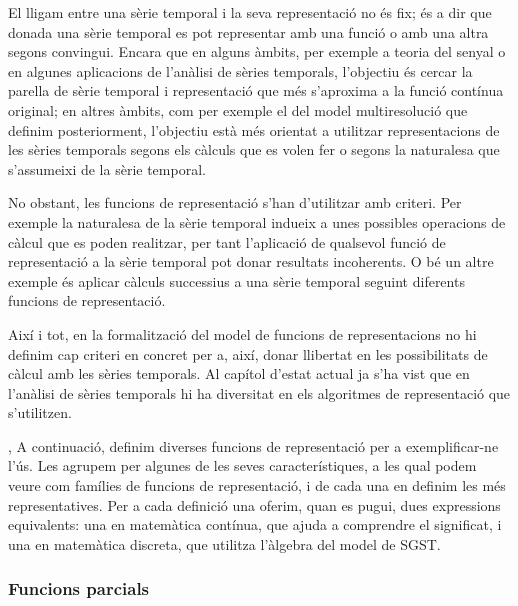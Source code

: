 El lligam entre una sèrie temporal i la seva representació no és fix;
és a dir que donada una sèrie temporal es pot representar amb una
funció o amb una altra segons convingui.  Encara que en alguns àmbits,
per exemple a teoria del senyal o en algunes aplicacions de l'anàlisi
de sèries temporals, l'objectiu és cercar la parella de sèrie temporal
i representació que més s'aproxima a la funció contínua original; en
altres àmbits, com per exemple el del model multiresolució que definim
posteriorment, l'objectiu està més orientat a utilitzar
representacions de les sèries temporals segons els càlculs que es
volen fer o segons la naturalesa que s'assumeixi de la sèrie temporal.


No obstant, les funcions de representació s'han d'utilitzar amb
criteri. Per exemple la naturalesa de la sèrie temporal indueix a unes
possibles operacions de càlcul que es poden realitzar, per tant
l'aplicació de qualsevol funció de representació a la sèrie temporal
pot donar resultats incoherents. O bé un altre exemple és aplicar
càlculs successius a una sèrie temporal seguint diferents funcions de
representació.  

Així i tot, en la formalització del model de funcions de
representacions no hi definim cap criteri en concret per a, així,
donar llibertat en les possibilitats de càlcul amb les sèries
temporals. Al capítol  d'estat actual ja s'ha vist que en
l'anàlisi de sèries temporals hi ha diversitat en els algoritmes de
representació que s'utilitzen.

,
A continuació, definim diverses funcions de representació per a
exemplificar-ne l'ús. Les agrupem per algunes de les seves
característiques, a les qual podem veure com famílies de funcions de
representació, i de cada una en definim les més representatives. Per a
cada definició una oferim, quan es pugui, dues expressions
equivalents: una en matemàtica contínua, que ajuda a comprendre el
significat, i una en matemàtica discreta, que utilitza l'àlgebra del
model de SGST.



\subsubsection{Funcions parcials}


